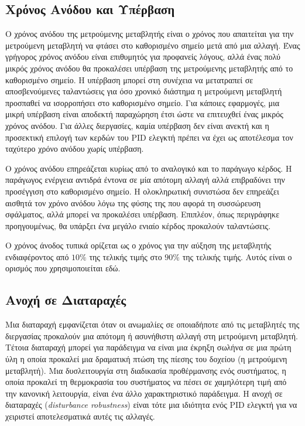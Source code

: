 \subsection{Χρόνος Ανόδου και Υπέρβαση} \label{subsce:rise_time}

Ο χρόνος ανόδου της μετρούμενης μεταβλητής είναι ο χρόνος που απαιτείται για την μετρούμενη μεταβλητή να φτάσει στο καθορισμένο σημείο μετά από μια αλλαγή. Ένας γρήγορος χρόνος ανόδου είναι επιθυμητός για προφανείς λόγους, αλλά ένας πολύ μικρός χρόνος ανόδου θα προκαλέσει υπέρβαση της μετρούμενης μεταβλητής από το καθορισμένο σημείο. Η υπέρβαση μπορεί στη συνέχεια να μετατραπεί σε αποσβενούμενες ταλαντώσεις για όσο χρονικό διάστημα η μετρούμενη μεταβλητή προσπαθεί να ισορροπήσει στο καθορισμένο σημείο. Για κάποιες εφαρμογές, μια μικρή υπέρβαση είναι αποδεκτή παραχώρηση έτσι ώστε να επιτευχθεί ένας μικρός χρόνος ανόδου. Για άλλες διεργασίες, καμία υπέρβαση δεν είναι ανεκτή και η προσεκτική επιλογή των κερδών του PID ελεγκτή πρέπει να έχει ως αποτέλεσμα τον ταχύτερο χρόνο ανόδου χωρίς υπέρβαση. 

Ο χρόνος ανόδου επηρεάζεται κυρίως από το αναλογικό και το παράγωγο κέρδος. Η παράγωγος ενέργεια αντιδρά έντονα σε μία απότομη αλλαγή αλλά επιβραδύνει την προσέγγιση στο καθορισμένο σημείο. Η ολοκληρωτική συνιστώσα δεν επηρεάζει αισθητά τον χρόνο ανόδου λόγω της φύσης της που αφορά τη συσσώρευση σφάλματος, αλλά μπορεί να προκαλέσει υπέρβαση. Επιπλέον, όπως περιγράφηκε προηγουμένως, θα υπάρξει ένα μεγάλο ενιαίο κέρδος προκαλούν ταλαντώσεις. 

Ο χρόνος άνοδος τυπικά ορίζεται ως ο χρόνος για την αύξηση της μεταβλητής ενδιαφέροντος από $10\%$ της τελικής τιμής στο $90\%$ της τελικής τιμής. Αυτός είναι ο ορισμός που χρησιμοποιείται εδώ.

\subsection{Ανοχή σε Διαταραχές}

Μια διαταραχή εμφανίζεται όταν οι ανωμαλίες σε οποιαδήποτε από τις μεταβλητές της διεργασίας προκαλούν μια απότομη ή ασυνήθιστη αλλαγή στη μετρούμενη μεταβλητή. Τέτοια διαταραχή μπορεί για παράδειγμα να είναι μια έκρηξη σωλήνα σε μια πρώτη ύλη η οποία προκαλεί μια δραματική πτώση της πίεσης του δοχείου (η μετρούμενη μεταβλητή). Μια δυσλειτουργία στη διαδικασία προθέρμανσης ενός συστήματος, η οποία προκαλεί τη θερμοκρασία του συστήματος να πέσει σε χαμηλότερη τιμή από την κανονική λειτουργία, είναι ένα άλλο χαρακτηριστικό παράδειγμα. Η ανοχή σε διαταραχές (\emph{disturbance robustness}) είναι τότε μια ιδιότητα ενός PID ελεγκτή για να χειριστεί αποτελεσματικά αυτές τις αλλαγές.

